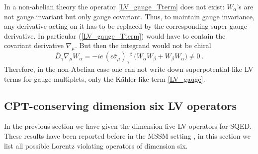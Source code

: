 \documentclass[12pt]{revtex4}
\begin{document}
In a non-abelian theory the operator 
\eqref{LV_gauge_Tterm} does not exist:
$W_\alpha$'s are not gauge invariant but only gauge covariant.
Thus, to maintain gauge invariance, any derivative acting on it has to
be replaced by the corresponding super gauge derivative. 
In particular
 (\ref{LV_gauge_Tterm}) would have to contain the covariant
derivative $\nabla_\mu$.  But then the integrand would not be chiral 
\begin{equation}
\overline{D}_{\dot\gamma} \nabla_\mu W_\alpha = 
-i e\, (\epsilon \bar\sigma_\mu)_{\dot\gamma}{}^\beta\, 
\Big( W_\alpha W_\beta + W_\beta W_\alpha \Big) \neq 0~. 
\end{equation} 
Therefore, in the non-Abelian case one can not write down
superpotential-like LV terms for gauge multiplets, only 
the K\"ahler-like term \eqref{LV_gauge}. 


\subsection{CPT-conserving dimension six LV operators}
\label{Dim6}


In the previous section we have given the dimension five LV operators
for SQED. These results have been reported before in the MSSM 
setting \cite{GrootNibbelink:2004za}, in this section we list all
possible Lorentz violating operators of dimension six. 
\end{document}
